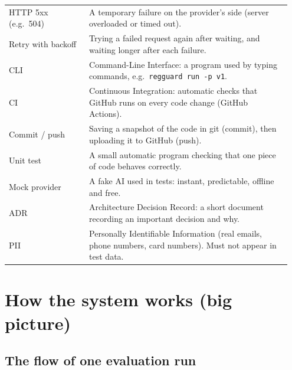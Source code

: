 \documentclass[11pt,a4paper]{article}
\begin{document}
\begin{longtable}{@{}p{0.27\linewidth}p{0.68\linewidth}@{}}
HTTP 5xx (e.g.\ 504) & A temporary failure on the provider's side (server overloaded or timed out). \\
Retry with backoff & Trying a failed request again after waiting, and waiting longer after each failure. \\
CLI & Command-Line Interface: a program used by typing commands, e.g.\ \texttt{regguard run -p v1}. \\
CI & Continuous Integration: automatic checks that GitHub runs on every code change (GitHub Actions). \\
Commit / push & Saving a snapshot of the code in git (commit), then uploading it to GitHub (push). \\
Unit test & A small automatic program checking that one piece of code behaves correctly. \\
Mock provider & A fake AI used in tests: instant, predictable, offline and free. \\
ADR & Architecture Decision Record: a short document recording an important decision and why. \\
PII & Personally Identifiable Information (real emails, phone numbers, card numbers). Must not appear in test data. \\
\bottomrule
\end{longtable}

\section{How the system works (big picture)}

\subsection{The flow of one evaluation run}
\end{document}
